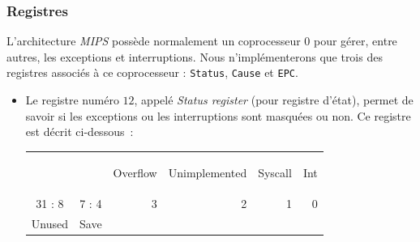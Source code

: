 \documentclass[12pt]{article}
\begin{document}
\subsubsection{Registres}

L'architecture \emph{MIPS} possède normalement un coprocesseur $0$ pour gérer, entre autres, les exceptions et interruptions. Nous n'implémenterons
que trois des registres associés à ce coprocesseur : \verb+Status+, \verb+Cause+ et \verb+EPC+.

\begin{itemize}

\item Le registre numéro $12$, appelé \emph{Status register} (pour registre d'état), permet de savoir si les exceptions ou les interruptions
  sont masquées ou non. Ce registre est décrit ci-dessous~:\\

\begin{center}
\begin{tabular}{ccrrrr}
 & & \begin{sideways} Overflow \end{sideways} & \begin{sideways} Unimplemented \end{sideways} & \begin{sideways} Syscall \end{sideways} & \begin{sideways} Int \end{sideways}\\
 31 : 8 & 7 : 4 & 3 & 2 & 1 & 0\\
\hline
\multicolumn{1}{|c}{\hspace*{3cm}Unused\hspace*{3cm}} & \multicolumn{1}{|c|}{\hspace*{1cm}Save\hspace*{1cm}} & \multicolumn{1}{|c|}{} & \multicolumn{1}{|c|}{} & \multicolumn{1}{|c|}{} & \multicolumn{1}{|c|}{} \\
\hline
\end{tabular}
\end{center}

\vspace{0.7cm}


\end{itemize}
\end{document}
